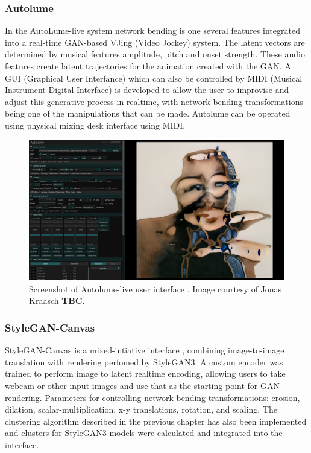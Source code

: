 \subsubsection{Autolume}

In the AutoLume-live system \citep{kraasch2022autolume,kraasch2023autolume} network bending is one several features integrated into a real-time GAN-based VJing (Video Jockey) system. 
The latent vectors are determined by musical features amplitude, pitch and onset strength. 
These audio features create latent trajectories for the animation created with the GAN. 
A GUI (Graphical User Interfance) which can also be controlled by MIDI (Musical Instrument Digital Interface) is developed to allow the user to improvise and adjust this generative process in realtime, with network bending transformations being one of the manipulations that can be made. 
Autolume can be operated using physical mixing desk interface using MIDI.

\begin{figure}[!htb]
    \centering
    \captionsetup{justification=centering}
    \includegraphics[width=1\textwidth]{figures/c7_impact/net-bend-technical/autolume-live.png}
    \caption[Autolume-live user interface]{Screenshot of Autolume-live user interface \citep{kraasch2023autolume}. Image courtesy of Jonas Kraasch \textbf{TBC}.}
    \label{fig:c7:autolume-live}
\end{figure}

\subsubsection{StyleGAN-Canvas}

StyleGAN-Canvas is a mixed-intiative interface \citep{zheng2023stylegan}, combining image-to-image translation with rendering perfomed by StyleGAN3. 
A custom encoder was trained to perform image to latent realtime encoding, allowing users to take webcam or other input images and use that as the starting point for GAN rendering. 
Parameters for controlling network bending transformations:  erosion, dilation, scalar-multiplication, x-y translations, rotation, and scaling. 
The clustering algorithm described in the previous chapter has also been implemented and clusters for StyleGAN3 models were calculated and integrated into the interface.

